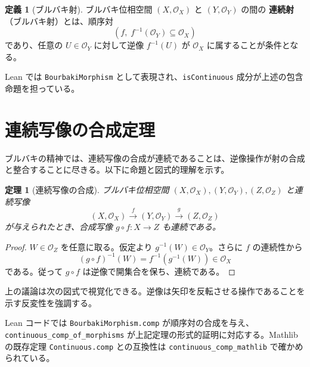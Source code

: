 \documentclass[a4paper]{ltjsarticle}
\theoremstyle{definition}
\newtheorem{definition}{定義}
\theoremstyle{plain}
\newtheorem{theorem}{定理}
\begin{document}
\begin{definition}[ブルバキ射]
ブルバキ位相空間 $(X,\mathcal{O}_X)$ と $(Y,\mathcal{O}_Y)$ の間の \textbf{連続射}（ブルバキ射）とは、順序対
\[
(f, \; f^{-1}(\mathcal{O}_Y) \subseteq \mathcal{O}_X)
\]
であり、任意の $U \in \mathcal{O}_Y$ に対して逆像 $f^{-1}(U)$ が $\mathcal{O}_X$ に属することが条件となる。
\end{definition}

Lean では \texttt{BourbakiMorphism} として表現され、\texttt{isContinuous} 成分が上述の包含命題を担っている。

\section{連続写像の合成定理}
ブルバキの精神では、連続写像の合成が連続であることは、逆像操作が射の合成と整合することに尽きる。以下に命題と図式的理解を示す。

\begin{theorem}[連続写像の合成]
ブルバキ位相空間 $(X,\mathcal{O}_X),(Y,\mathcal{O}_Y),(Z,\mathcal{O}_Z)$ と連続写像
\[
(X,\mathcal{O}_X) \xrightarrow{f} (Y,\mathcal{O}_Y) \xrightarrow{g} (Z,\mathcal{O}_Z)
\]
が与えられたとき、合成写像 $g \circ f : X \to Z$ も連続である。
\end{theorem}

\begin{proof}
$W \in \mathcal{O}_Z$ を任意に取る。仮定より $g^{-1}(W) \in \mathcal{O}_Y$。さらに $f$ の連続性から
\[
(g \circ f)^{-1}(W) = f^{-1}(g^{-1}(W)) \in \mathcal{O}_X
\]
である。従って $g \circ f$ は逆像で開集合を保ち、連続である。
\end{proof}

上の議論は次の図式で視覚化できる。逆像は矢印を反転させる操作であることを示す反変性を強調する。

\begin{center}
\end{center}

Lean コードでは \texttt{BourbakiMorphism.comp} が順序対の合成を与え、\texttt{continuous\_comp\_of\_morphisms} が上記定理の形式的証明に対応する。Mathlib の既存定理 \texttt{Continuous.comp} との互換性は \texttt{continuous\_comp\_mathlib} で確かめられている。
\end{document}
